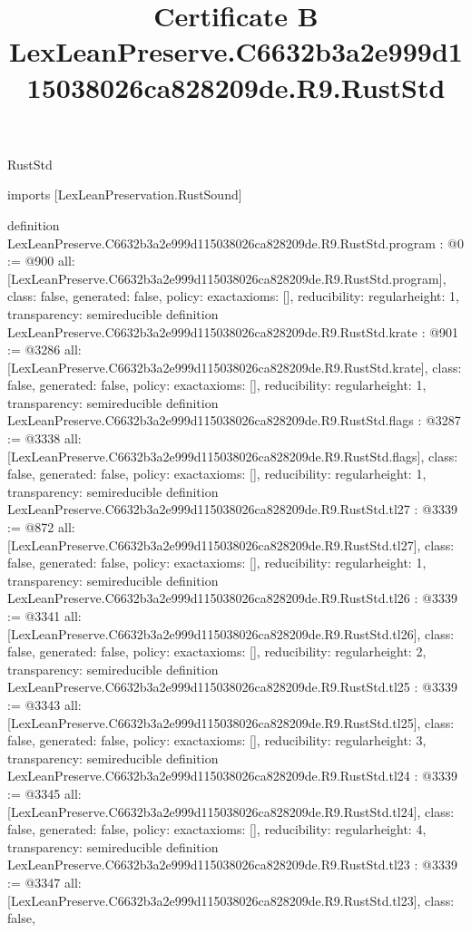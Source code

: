 \begin{lexlean}{RustStd}
\title{Certificate B LexLeanPreserve.C6632b3a2e999d115038026ca828209de.R9.RustStd}
\begin{coremodule}
imports [LexLeanPreservation.RustSound]

definition LexLeanPreserve.C6632b3a2e999d115038026ca828209de.R9.RustStd.program : @0 := @900 {
  all: [LexLeanPreserve.C6632b3a2e999d115038026ca828209de.R9.RustStd.program],
  class: false,
  generated: false,
  policy: exact{axioms: []},
  reducibility: regular{height: 1},
  transparency: semireducible
}
definition LexLeanPreserve.C6632b3a2e999d115038026ca828209de.R9.RustStd.krate : @901 := @3286 {
  all: [LexLeanPreserve.C6632b3a2e999d115038026ca828209de.R9.RustStd.krate],
  class: false,
  generated: false,
  policy: exact{axioms: []},
  reducibility: regular{height: 1},
  transparency: semireducible
}
definition LexLeanPreserve.C6632b3a2e999d115038026ca828209de.R9.RustStd.flags : @3287 := @3338 {
  all: [LexLeanPreserve.C6632b3a2e999d115038026ca828209de.R9.RustStd.flags],
  class: false,
  generated: false,
  policy: exact{axioms: []},
  reducibility: regular{height: 1},
  transparency: semireducible
}
definition LexLeanPreserve.C6632b3a2e999d115038026ca828209de.R9.RustStd.tl27 : @3339 := @872 {
  all: [LexLeanPreserve.C6632b3a2e999d115038026ca828209de.R9.RustStd.tl27],
  class: false,
  generated: false,
  policy: exact{axioms: []},
  reducibility: regular{height: 1},
  transparency: semireducible
}
definition LexLeanPreserve.C6632b3a2e999d115038026ca828209de.R9.RustStd.tl26 : @3339 := @3341 {
  all: [LexLeanPreserve.C6632b3a2e999d115038026ca828209de.R9.RustStd.tl26],
  class: false,
  generated: false,
  policy: exact{axioms: []},
  reducibility: regular{height: 2},
  transparency: semireducible
}
definition LexLeanPreserve.C6632b3a2e999d115038026ca828209de.R9.RustStd.tl25 : @3339 := @3343 {
  all: [LexLeanPreserve.C6632b3a2e999d115038026ca828209de.R9.RustStd.tl25],
  class: false,
  generated: false,
  policy: exact{axioms: []},
  reducibility: regular{height: 3},
  transparency: semireducible
}
definition LexLeanPreserve.C6632b3a2e999d115038026ca828209de.R9.RustStd.tl24 : @3339 := @3345 {
  all: [LexLeanPreserve.C6632b3a2e999d115038026ca828209de.R9.RustStd.tl24],
  class: false,
  generated: false,
  policy: exact{axioms: []},
  reducibility: regular{height: 4},
  transparency: semireducible
}
definition LexLeanPreserve.C6632b3a2e999d115038026ca828209de.R9.RustStd.tl23 : @3339 := @3347 {
  all: [LexLeanPreserve.C6632b3a2e999d115038026ca828209de.R9.RustStd.tl23],
  class: false,
}
\end{coremodule}
\end{lexlean}
